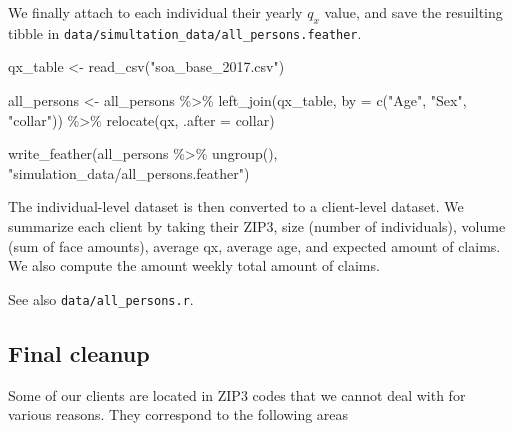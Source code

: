 \documentclass[
]{article}
\newenvironment{Shaded}{\begin{snugshade}}{\end{snugshade}}
\newcommand{\AttributeTok}[1]{\textcolor[rgb]{0.77,0.63,0.00}{#1}}
\newcommand{\FunctionTok}[1]{\textcolor[rgb]{0.00,0.00,0.00}{#1}}
\newcommand{\NormalTok}[1]{#1}
\newcommand{\OtherTok}[1]{\textcolor[rgb]{0.56,0.35,0.01}{#1}}
\newcommand{\SpecialCharTok}[1]{\textcolor[rgb]{0.00,0.00,0.00}{#1}}
\newcommand{\StringTok}[1]{\textcolor[rgb]{0.31,0.60,0.02}{#1}}
\begin{document}
We finally attach to each individual their yearly \(q_x\) value, and
save the resuilting tibble in
\texttt{data/simultation\_data/all\_persons.feather}.

\begin{Shaded}
\begin{Highlighting}[]
\NormalTok{qx\_table }\OtherTok{\textless{}{-}} \FunctionTok{read\_csv}\NormalTok{(}\StringTok{"soa\_base\_2017.csv"}\NormalTok{)}

\NormalTok{all\_persons }\OtherTok{\textless{}{-}}
\NormalTok{  all\_persons }\SpecialCharTok{\%\textgreater{}\%}
  \FunctionTok{left\_join}\NormalTok{(qx\_table, }\AttributeTok{by =} \FunctionTok{c}\NormalTok{(}\StringTok{"Age"}\NormalTok{, }\StringTok{"Sex"}\NormalTok{, }\StringTok{"collar"}\NormalTok{)) }\SpecialCharTok{\%\textgreater{}\%}
  \FunctionTok{relocate}\NormalTok{(qx, }\AttributeTok{.after =}\NormalTok{ collar)}

\FunctionTok{write\_feather}\NormalTok{(all\_persons }\SpecialCharTok{\%\textgreater{}\%} \FunctionTok{ungroup}\NormalTok{(), }\StringTok{"simulation\_data/all\_persons.feather"}\NormalTok{)}
\end{Highlighting}
\end{Shaded}

The individual-level dataset is then converted to a client-level
dataset. We summarize each client by taking their ZIP3, size (number of
individuals), volume (sum of face amounts), average qx, average age, and
expected amount of claims. We also compute the amount weekly total
amount of claims.

See also \texttt{data/all\_persons.r}.

\hypertarget{final-cleanup}{%
\subsection{Final cleanup}\label{final-cleanup}}

Some of our clients are located in ZIP3 codes that we cannot deal with
for various reasons. They correspond to the following areas
\end{document}
